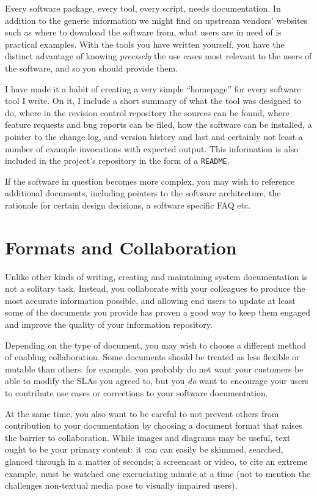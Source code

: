 Every software package, every tool, every script,
needs documentation.  In addition to the generic
information we might find on upstream vendors'
websites such as where to download the software from,
what users are in need of is practical examples.  With
the tools you have written yourself, you have the
distinct advantage of knowing {\em precisely} the use
cases most relevant to the users of the software, and
so you should provide them.

I have made it a habit of creating a very simple
``homepage'' for every software tool I write.  On it,
I include a short summary of what the tool was
designed to do, where in the revision control
repository the sources can be found, where feature
requests and bug reports can be filed, how the
software can be installed, a pointer to the change
log, and version history and last and certainly not
least a number of example invocations with expected
output.  This information is also included in the
project's repository in the form of a {\tt README}.

If the software in question becomes more complex, you
may wish to reference additional documents, including
pointers to the software architecture, the rationale
for certain design decisions, a software specific FAQ
etc.

\section{Formats and Collaboration}
\label{documentation:formats-and-collaboration}

Unlike other kinds of writing, creating and
maintaining system documentation is not a solitary
task.  Instead, you collaborate with your colleagues
to produce the most accurate information possible, and
allowing end users to update at least some of the
documents you provide has proven a good way to keep
them engaged and improve the quality of your
information repository.

Depending on the type of document, you may wish to
choose a different method of enabling collaboration.
Some documents should be treated as less flexible or
mutable than others: for example, you probably do not
want your customers be able to modify the SLAs you
agreed to, but you {\em do} want to encourage your
users to contribute use cases or corrections to your
software documentation.

At the same time, you also want to be careful to not
prevent others from contribution to your documentation
by choosing a document format that raises the barrier
to collaboration.  While images and diagrams may be
useful, text ought to be your primary content: it can
can easily be skimmed, searched, glanced through in a
matter of seconds; a screencast or video, to cite an
extreme example, must be watched one excruciating
minute at a time (not to mention the challenges
non-textual media pose to visually impaired users).

